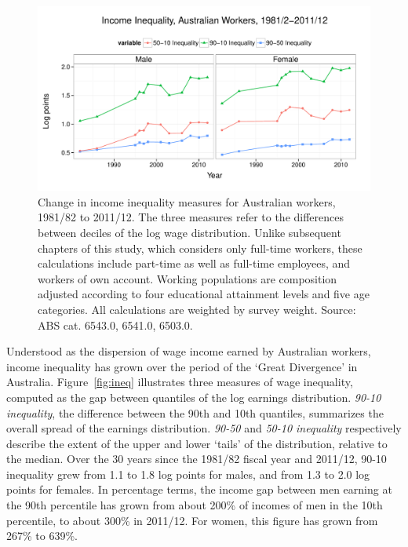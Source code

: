 \begin{figure}[h]
  \centering
  \includegraphics[width=\textwidth]{../figure/ineq_time.pdf}
  \caption{Change in income inequality measures for Australian workers, 1981/82 to 2011/12. The three measures refer to the differences between deciles of the log wage distribution. Unlike subsequent chapters of this study, which considers only full-time workers, these calculations include part-time as well as full-time employees, and workers of own account. Working populations are composition adjusted according to four educational attainment levels and five age categories. All calculations are weighted by survey weight. Source: ABS cat. 6543.0, 6541.0, 6503.0.}
\end{figure}

Understood as the dispersion of wage income earned by Australian workers, income inequality has grown over the period of the `Great Divergence' in Australia. Figure~\ref{fig:ineq} illustrates three measures of wage inequality, computed as the gap between quantiles of the log earnings distribution. {\em 90-10 inequality}, the difference between the 90th and 10th quantiles, summarizes the overall spread of the earnings distribution. {\em 90-50} and {\em 50-10 inequality} respectively describe the extent of the upper and lower `tails' of the distribution, relative to the median. Over the 30 years since the 1981/82 fiscal year and 2011/12, 90-10 inequality grew from 1.1 to 1.8 log points for males, and from 1.3 to 2.0 log points for females. In percentage terms, the income gap between men earning at the 90th percentile has grown from about 200\% of incomes of men in the 10th percentile, to about 300\% in 2011/12. For women, this figure has grown from 267\% to 639\%.


